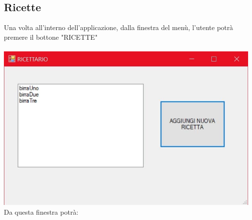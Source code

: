 \documentclass[a4paper, titlepage]{article}
\begin{document}
\subsection{Ricette}
Una volta all'interno dell'applicazione, dalla finestra del menù, l'utente potrà premere il bottone "RICETTE"\\\\
\includegraphics[scale=0.30]{Immagini/form/Form GestioneRicette.jpg}
\\Da questa finestra potrà:
\end{document}
